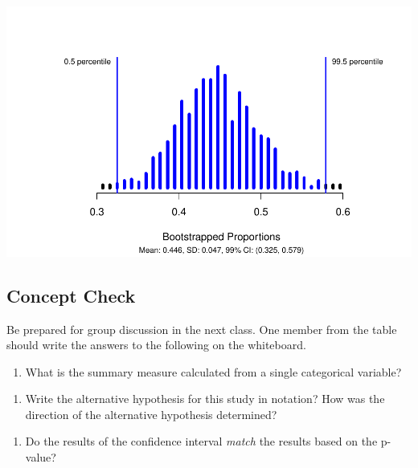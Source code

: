 \documentclass[
]{report}
\providecommand{\tightlist}{%
  \setlength{\itemsep}{0pt}\setlength{\parskip}{0pt}}
\begin{document}
\begin{center}\includegraphics[width=0.7\linewidth]{03-VN03-EDA_OneCatSimulation_files/figure-latex/unnamed-chunk-11-1} \end{center}

\subsection{Concept Check}\label{concept-check-3}

Be prepared for group discussion in the next class. One member from the table should write the answers to the following on the whiteboard.

\begin{enumerate}
\def\labelenumi{\arabic{enumi}.}
\tightlist
\item
  What is the summary measure calculated from a single categorical variable?
\end{enumerate}

\vspace{0.3in}

\begin{enumerate}
\def\labelenumi{\arabic{enumi}.}
\setcounter{enumi}{1}
\tightlist
\item
  Write the alternative hypothesis for this study in notation? How was the direction of the alternative hypothesis determined?
\end{enumerate}

\vspace{0.4in}

\begin{enumerate}
\def\labelenumi{\arabic{enumi}.}
\setcounter{enumi}{2}
\tightlist
\item
  Do the results of the confidence interval \emph{match} the results based on the p-value?
\end{enumerate}

\vspace{0.5in}
\end{document}
